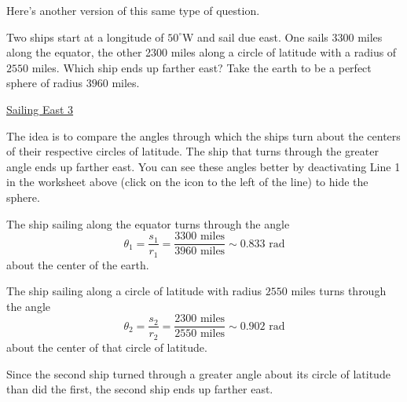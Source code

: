 \documentclass{ximera}
\newcommand{\pskip}{\vskip 0.1 in}
\begin{document}
Here's another version of this same type of question.





\begin{question}  \label{Q2543:Angles}
Two ships start at a longitude of $50^\circ$W and sail due east. One sails 3300 miles along the equator, the other 2300 miles along a circle of latitude with a radius of $2550$ miles. Which ship ends up farther east? Take the earth to be a perfect sphere of radius $3960$ miles.

\begin{onlineOnly}
    \begin{center}
\end{center}
\end{onlineOnly}


\href{https://www.desmos.com/3d/kwj7trr8pr}{Sailing East 3}

\begin{explanation}
The idea is to compare the angles through which the ships turn about the centers of their respective circles of latitude. The ship that turns through the greater angle ends up farther east. You can see these angles better by deactivating Line 1 in the worksheet above (click on the icon to the left of the line) to hide the sphere.

The ship sailing along the equator turns through the angle
\[
 \theta_1 = \frac{s_1}{r_1} = \frac{3300 \text{ miles}}{3960 \text{ miles}} \sim 0.833\text{ rad}
\]
about the center of the earth. 

The ship sailing along a circle of latitude with radius $2550$ miles turns through the angle
\[
 \theta_2= \frac{s_2}{r_2} = \frac{2300 \text{ miles}}{2550 \text{ miles}} \sim 0.902\text{ rad}
\]
about the center of that circle of latitude.

Since the second ship turned through a greater angle about its circle of latitude than did the first, the second ship ends up farther east.

\end{explanation}

\end{question}
\end{document}
